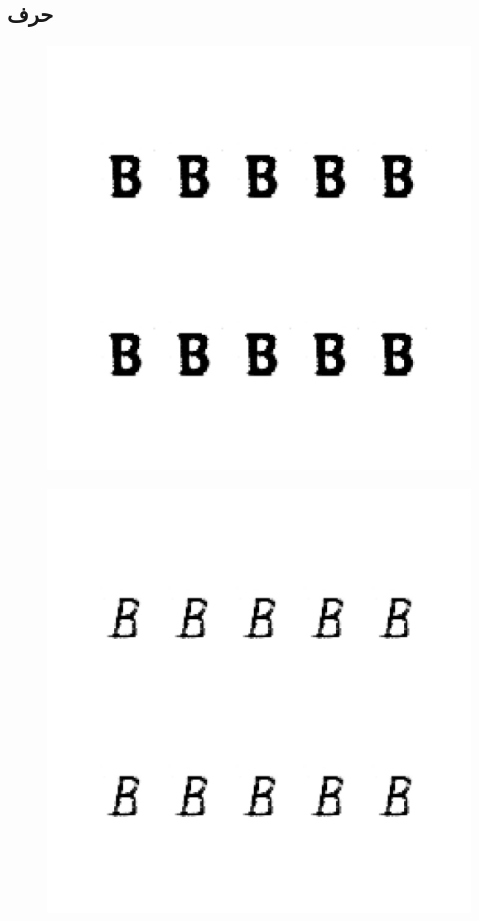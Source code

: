 \documentclass{article}
\begin{document}
\subsection{حرف }
\begin{figure}[H]
	\centerline{\includegraphics[width=\textwidth , height=\textheight ]{../results/CGAN_Adam/figs/letters/B/95.pdf}}
\end{figure}
\begin{figure}[H]
	\centerline{\includegraphics[width=\textwidth , height=\textheight ]{../results/CGAN_Adam/figs/letters/B/90.pdf}}
\end{figure}
\end{document}
